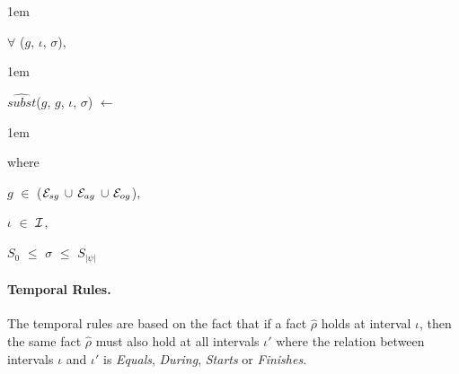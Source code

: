 \documentclass[11pt]{report}
\newenvironment{vquote}
{
  \begin{list}{}{\leftmargin 1em}\item[]
}
{
  \end{list}
}
\begin{document}
            \begin{vquote}
              $\forall$ ($g$, $\iota$, $\sigma$),
            \end{vquote}

            \begin{vquote}
              $\hat{subst}$($g$, $g$, $\iota$, $\sigma$) $\leftarrow$
            \end{vquote}

            \begin{vquote}
              where

              \hspace{1em}
              $g$ $\in$ (${\cal E}_{sg}$ $\cup$ ${\cal E}_{ag}$ $\cup$ ${\cal E}_{og}$),

              \hspace{1em}
              $\iota$ $\in$ ${\cal I}$,

              \hspace{1em}
              $S_{0}$ $\leq$ $\sigma$ $\leq$ $S_{|\psi|}$
            \end{vquote}

          \paragraph
            {\bf Temporal Rules.}

            The temporal rules are based on the fact that if a fact
            $\hat{\rho}$ holds at interval $\iota$, then the same fact
            $\hat{\rho}$ must also hold at all intervals $\iota'$ where
            the relation between intervals $\iota$ and $\iota'$ is
            {\em Equals}, {\em During}, {\em Starts} or {\em Finishes}.
\end{document}
